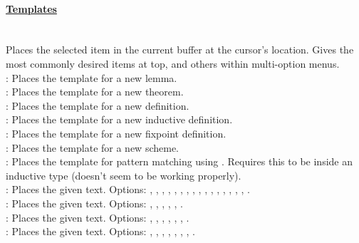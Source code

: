 \paragraph{\underline{Templates}}
~\\
Places the selected item in the current buffer at the cursor's location. 
Gives the most commonly desired items at top, and others within multi-option menus. 
~\\
 : Places the template for a new lemma. 
\\
 : Places the template for a new theorem. 
\\
 : Places the template for a new definition. 
\\
 : Places the template for a new inductive definition. 
\\
 : Places the template for a new fixpoint definition. 
\\
 : Places the template for a new scheme. 
\\
 : Places the template for pattern matching using . 
	Requires this to be inside an inductive type (doesn't seem to be working properly). 
\\
 : Places the given text. Options: 
	, 
	, 
	, , , , 
	, , , 
	, , , 
	, 
	, 
	, , . 
\\
 : Places the given text. Options: 
	, , , , 
	, . 
\\
 : Places the given text. Options: 
	, , , , 
	, , .
\\
 : Places the given text. Options: 
	, , , , , 
	, , . 
\\
